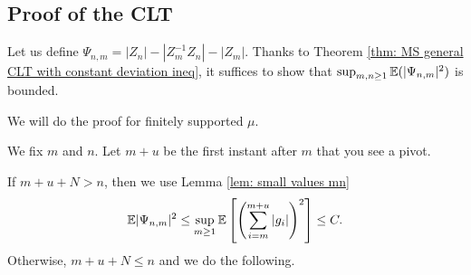 \subsection{Proof of the CLT}

Let us define $\Psi_{n,m}=|Z_n|-|Z_m^{-1}Z_n|-|Z_m|$. Thanks to Theorem \ref{thm: MS general CLT with constant deviation ineq}, it suffices to show that $\sup_{m,n\ge 1}\mathbb{E}(|\Psi_{n,m}|^2)$ is bounded.

We will do the proof for finitely supported $\mu$.

We fix $m$ and $n$. Let $m+u$ be the first instant after $m$ that you see a pivot.

If $m+u+N>n$, then we use Lemma \ref{lem: small values mn} 
$$
\mathbb{E} |\Psi_{n,m}|^2\le \sup_{m\ge 1}\mathbb{E}\left[\left( \sum_{i=m}^{m+u}|g_i| \right)^2\right]\le C.
$$
Otherwise, $m+u+N\le n$ and we do the following.


